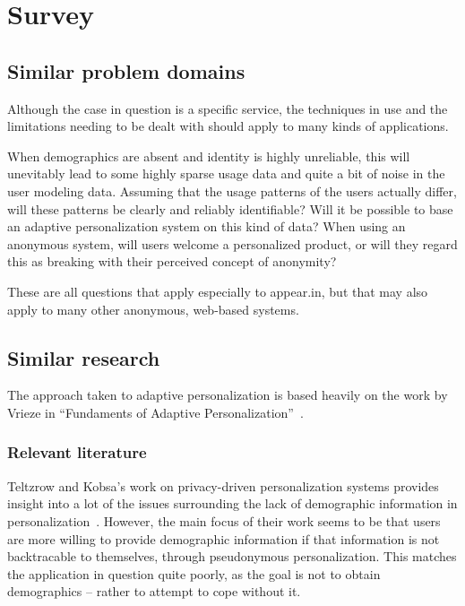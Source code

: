 \chapter{Survey}

\label{Chapter2}


\section{Similar problem domains} %
\label{sec:similar_problem_domains}

Although the case in question is a specific service, the techniques in use and the limitations needing to be dealt with should apply to many kinds of applications.

When demographics are absent and identity is highly unreliable, this will unevitably lead to some highly sparse usage data and quite a bit of noise in the user modeling data.
Assuming that the usage patterns of the users actually differ, will these patterns be clearly and reliably identifiable?
Will it be possible to base an adaptive personalization system on this kind of data?
When using an anonymous system, will users welcome a personalized product, or will they regard this as breaking with their perceived concept of anonymity?

These are all questions that apply especially to appear.in, but that may also apply to many other anonymous, web-based systems.


\section{Similar research} %
\label{sec:similar_applications}

The approach taken to adaptive personalization is based heavily on the work by Vrieze in ``Fundaments of Adaptive Personalization''~\cite{Vrieze}.

\subsection{Relevant literature} %
\label{sub:relevant_literature}

Teltzrow and Kobsa's work on privacy-driven personalization systems provides insight into a lot of the issues surrounding the lack of demographic information in personalization~\cite{Teltzrow2004,Kobsa2007}. However, the main focus of their work seems to be that users are more willing to provide demographic information if that information is not backtracable to themselves, through pseudonymous personalization.
This matches the application in question quite poorly, as the goal is not to obtain demographics -- rather to attempt to cope without it.

